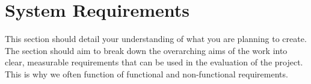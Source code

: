 
\chapter{System Requirements}

This section should detail your understanding of what you are planning to
create. The section should aim to break down the overarching aims of the work into clear,
measurable requirements that can be used in the evaluation of the project. This is why we often
function of functional and non-functional requirements.
